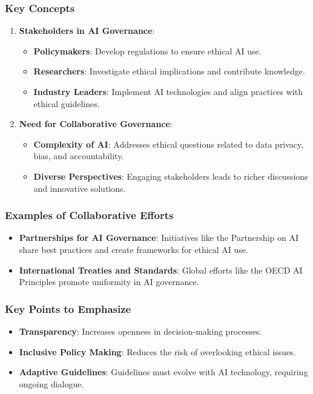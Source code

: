 \documentclass[aspectratio=169]{beamer}
\begin{document}
\begin{frame}[fragile]
    \frametitle{Key Concepts}
    \begin{enumerate}
        \item \textbf{Stakeholders in AI Governance}:
            \begin{itemize}
                \item \textbf{Policymakers}: Develop regulations to ensure ethical AI use.
                \item \textbf{Researchers}: Investigate ethical implications and contribute knowledge.
                \item \textbf{Industry Leaders}: Implement AI technologies and align practices with ethical guidelines.
            \end{itemize}

        \item \textbf{Need for Collaborative Governance}:
            \begin{itemize}
                \item \textbf{Complexity of AI}: Addresses ethical questions related to data privacy, bias, and accountability.
                \item \textbf{Diverse Perspectives}: Engaging stakeholders leads to richer discussions and innovative solutions.
            \end{itemize}
    \end{enumerate}
\end{frame}

\begin{frame}[fragile]
    \frametitle{Examples of Collaborative Efforts}
    \begin{itemize}
        \item \textbf{Partnerships for AI Governance}: Initiatives like the Partnership on AI share best practices and create frameworks for ethical AI use.
        \item \textbf{International Treaties and Standards}: Global efforts like the OECD AI Principles promote uniformity in AI governance.
    \end{itemize}
\end{frame}

\begin{frame}[fragile]
    \frametitle{Key Points to Emphasize}
    \begin{itemize}
        \item \textbf{Transparency}: Increases openness in decision-making processes.
        \item \textbf{Inclusive Policy Making}: Reduces the risk of overlooking ethical issues.
        \item \textbf{Adaptive Guidelines}: Guidelines must evolve with AI technology, requiring ongoing dialogue.
    \end{itemize}
\end{frame}
\end{document}

